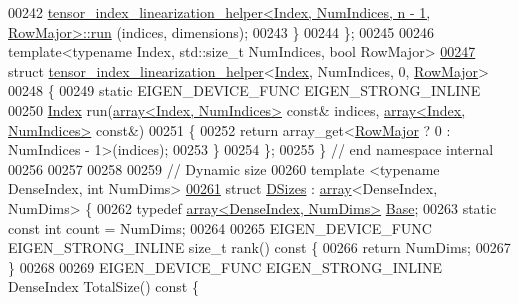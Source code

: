 \begin{DoxyCode}
00242         
      \hyperlink{struct_eigen_1_1internal_1_1tensor__index__linearization__helper}{tensor\_index\_linearization\_helper<Index, NumIndices, n - 1, RowMajor>::run}
      (indices, dimensions);
00243   \}
00244 \};
00245 
00246 \textcolor{keyword}{template}<\textcolor{keyword}{typename} Index, std::\textcolor{keywordtype}{size\_t} NumIndices, \textcolor{keywordtype}{bool} RowMajor>
\hyperlink{struct_eigen_1_1internal_1_1tensor__index__linearization__helper_3_01_index_00_01_num_indices_00_010_00_01_row_major_01_4}{00247} \textcolor{keyword}{struct }\hyperlink{struct_eigen_1_1internal_1_1tensor__index__linearization__helper}{tensor\_index\_linearization\_helper}<\hyperlink{namespace_eigen_a62e77e0933482dafde8fe197d9a2cfde}{Index}, NumIndices, 0, 
      \hyperlink{group__enums_ggaacded1a18ae58b0f554751f6cdf9eb13acfcde9cd8677c5f7caf6bd603666aae3}{RowMajor}>
00248 \{
00249   \textcolor{keyword}{static} EIGEN\_DEVICE\_FUNC EIGEN\_STRONG\_INLINE
00250   \hyperlink{namespace_eigen_a62e77e0933482dafde8fe197d9a2cfde}{Index} run(\hyperlink{class_eigen_1_1array}{array<Index, NumIndices>} \textcolor{keyword}{const}& indices, 
      \hyperlink{class_eigen_1_1array}{array<Index, NumIndices>} \textcolor{keyword}{const}&)
00251   \{
00252     \textcolor{keywordflow}{return} array\_get<\hyperlink{group__enums_ggaacded1a18ae58b0f554751f6cdf9eb13acfcde9cd8677c5f7caf6bd603666aae3}{RowMajor} ? 0 : NumIndices - 1>(indices);
00253   \}
00254 \};
00255 \}  \textcolor{comment}{// end namespace internal}
00256 
00257 
00258 
00259 \textcolor{comment}{// Dynamic size}
00260 \textcolor{keyword}{template} <\textcolor{keyword}{typename} DenseIndex, \textcolor{keywordtype}{int} NumDims>
\hyperlink{struct_eigen_1_1_d_sizes}{00261} \textcolor{keyword}{struct }\hyperlink{struct_eigen_1_1_d_sizes}{DSizes} : \hyperlink{class_eigen_1_1array}{array}<DenseIndex, NumDims> \{
00262   \textcolor{keyword}{typedef} \hyperlink{class_eigen_1_1array}{array<DenseIndex, NumDims>} \hyperlink{class_eigen_1_1array}{Base};
00263   \textcolor{keyword}{static} \textcolor{keyword}{const} \textcolor{keywordtype}{int} count = NumDims;
00264 
00265   EIGEN\_DEVICE\_FUNC EIGEN\_STRONG\_INLINE \textcolor{keywordtype}{size\_t} rank()\textcolor{keyword}{ const }\{
00266     \textcolor{keywordflow}{return} NumDims;
00267   \}
00268 
00269   EIGEN\_DEVICE\_FUNC EIGEN\_STRONG\_INLINE DenseIndex TotalSize()\textcolor{keyword}{ const }\{

\end{DoxyCode}

